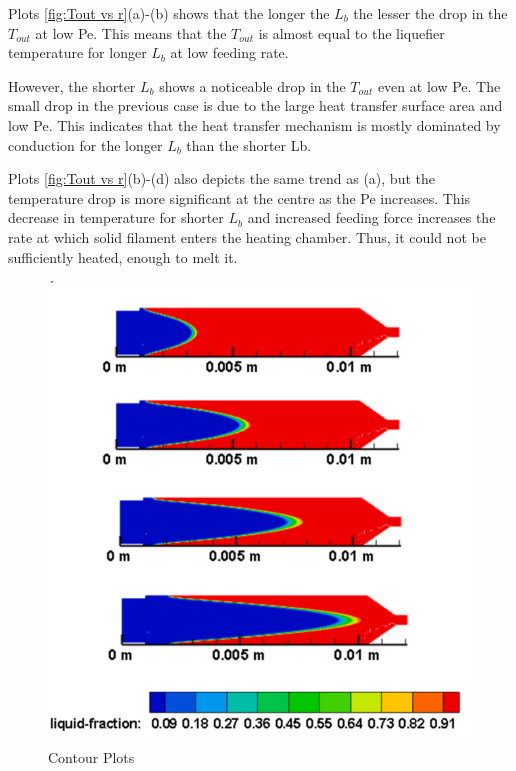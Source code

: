 \documentclass{report}
\begin{document}
{Plots \ref{fig:Tout vs r}(a)-(b) shows that the longer the $L_b$ the lesser the drop in the $T_{out}$ at low Pe. This means that the $T_{out}$ is almost equal to the liquefier temperature for longer $L_b$ at low feeding rate.

However, the shorter $L_b$ shows a noticeable drop in the $T_{out}$ even at low Pe. The small drop in the previous case is due to the large heat transfer surface area and low Pe. This indicates that the heat transfer mechanism is mostly dominated by conduction for the longer $L_b$ than the shorter Lb.

Plots \ref{fig:Tout vs r}(b)-(d) also depicts the same trend as (a), but the temperature drop is more significant at the centre as the Pe increases. This decrease in temperature for shorter $L_b$ and increased feeding force increases the rate at which solid filament enters the heating chamber. Thus, it could not be sufficiently heated, enough to melt it.

\newpage

\begin{figure}[!ht]
    \centering
    \includegraphics[scale=0.5]{Liq melting.png}
    \caption{Contour Plots}
    \label{fig:Liq Melting}
\end{figure}

}
\end{document}
